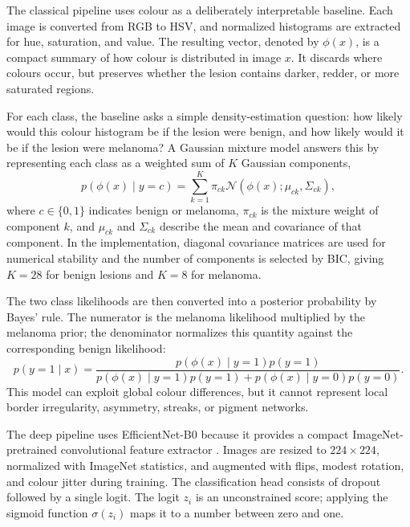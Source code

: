 \documentclass[11pt,a4paper]{article}
\begin{document}
The classical pipeline uses colour as a deliberately interpretable baseline. Each image is converted from RGB to HSV, and normalized histograms are extracted for hue, saturation, and value. The resulting vector, denoted by $\phi(x)$, is a compact summary of how colour is distributed in image $x$. It discards where colours occur, but preserves whether the lesion contains darker, redder, or more saturated regions.

For each class, the baseline asks a simple density-estimation question: how likely would this colour histogram be if the lesion were benign, and how likely would it be if the lesion were melanoma? A Gaussian mixture model answers this by representing each class as a weighted sum of $K$ Gaussian components,
\begin{equation}
    p(\phi(x) \mid y=c) = \sum_{k=1}^{K} \pi_{ck}\mathcal{N}\left(\phi(x); \mu_{ck}, \Sigma_{ck}\right),
\end{equation}
where $c \in \{0,1\}$ indicates benign or melanoma, $\pi_{ck}$ is the mixture weight of component $k$, and $\mu_{ck}$ and $\Sigma_{ck}$ describe the mean and covariance of that component. In the implementation, diagonal covariance matrices are used for numerical stability and the number of components is selected by BIC, giving $K=28$ for benign lesions and $K=8$ for melanoma.

The two class likelihoods are then converted into a posterior probability by Bayes' rule. The numerator is the melanoma likelihood multiplied by the melanoma prior; the denominator normalizes this quantity against the corresponding benign likelihood:
\begin{equation}
    p(y=1 \mid x) =
    \frac{p(\phi(x)\mid y=1)p(y=1)}
    {p(\phi(x)\mid y=1)p(y=1)+p(\phi(x)\mid y=0)p(y=0)}.
\end{equation}
\noindent This model can exploit global colour differences, but it cannot represent local border irregularity, asymmetry, streaks, or pigment networks.

The deep pipeline uses EfficientNet-B0 because it provides a compact ImageNet-pretrained convolutional feature extractor \citep{tan2019efficientnet}. Images are resized to $224 \times 224$, normalized with ImageNet statistics, and augmented with flips, modest rotation, and colour jitter during training. The classification head consists of dropout followed by a single logit. The logit $z_i$ is an unconstrained score; applying the sigmoid function $\sigma(z_i)$ maps it to a number between zero and one.
\end{document}
